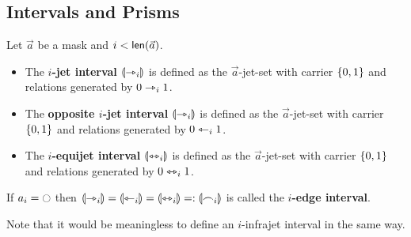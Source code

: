 \documentclass[a4paper]{article}
\begin{document}
\subsection{Intervals and Prisms}
\begin{definition} \label{def:interval}
	Let $\vec a$ be a mask and $i < \mathsf{len}(\vec a)$.
	\begin{itemize}
		\item The \textbf{$i$-jet interval} ${\llparenthesis \rightarrowtriangle_i \rrparenthesis}$ is defined as the $\vec a$-jet-set with carrier $\mathopen{}\left\{ 0, 1 \right\}\mathclose{}$ and relations generated by $0 \rightarrowtriangle_i 1$.
		\item The \textbf{opposite $i$-jet interval} ${\llparenthesis \rightarrowtriangle_i \rrparenthesis}$ is defined as the $\vec a$-jet-set with carrier $\mathopen{}\left\{ 0, 1 \right\}\mathclose{}$ and relations generated by $0 \leftarrowtriangle_i 1$.
		\item The \textbf{$i$-equijet interval} ${\llparenthesis \leftrightarrowtriangle_i \rrparenthesis}$ is defined as the $\vec a$-jet-set with carrier $\mathopen{}\left\{ 0, 1 \right\}\mathclose{}$ and relations generated by $0 \leftrightarrowtriangle_i 1$.
	\end{itemize}
	If $a_i = \npolar$ then ${\llparenthesis \rightarrowtriangle_i \rrparenthesis} = {\llparenthesis \leftarrowtriangle_i \rrparenthesis} = {\llparenthesis \leftrightarrowtriangle_i \rrparenthesis} =: {\llparenthesis \frown_i \rrparenthesis}$ is called the \textbf{$i$-edge interval}.
\end{definition}
Note that it would be meaningless to define an $i$-infrajet interval in the same way.
\end{document}
